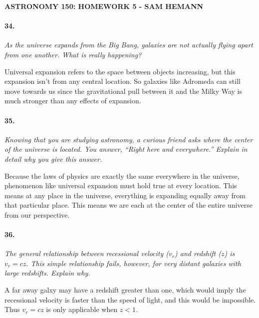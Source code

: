 \documentclass[letterpaper,11pt]{article}
\begin{document}
\begin{center}
	\bf
	ASTRONOMY 150: HOMEWORK 5 - SAM HEMANN
\end{center}



\paragraph{34.}
\it
As the universe expands from the Big Bang, galaxies are not actually flying apart from one another. What is really happening?
\smallskip
	\par
	\normalfont
	Universal expansion refers to the space between objects increasing, but this expansion isn't from any central location. So galaxies like Adromeda can still move towards us since the gravitational pull between it and the 	Milky Way is much stronger than any effects of expansion.



\paragraph{35.}
\it
Knowing that you are studying astronomy, a curious friend asks where the center of the universe is located. You answer, “Right here and everywhere.” Explain in detail why you give this answer.
\smallskip
	\par
	\normalfont
	Because the laws of physics are exactly the same everywhere in the universe, phenomenon like universal expansion must hold true at every location. This means at any place in the universe, everything is expanding equally away from that particular place. This means we are each at the center of the entire universe from our perspective.



\paragraph{36.}
\it
The general relationship between recessional velocity ($v_r$) and redshift ($z$) is $v_r = cz$. This simple relationship fails, however, for very distant galaxies with large redshifts. Explain why.
\smallskip
	\par
	\normalfont
	A far away galxy may have a redshift greater than one, which would imply the recessional velocity is faster than the speed of light, and this would be impossible. Thus $v_r = cz$ is only applicable when $z < 1$.
\end{document}

